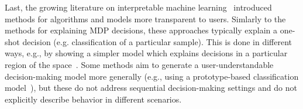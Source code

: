 
Last, the growing literature on interpretable machine learning~\cite{doshi2017towards,vellido2012making} introduced methods for algorithms and models more transparent to users. Simlarly to the methods for explaining MDP decisions, these approaches typically explain a one-shot decision (e.g. classification of a particular sample). This is done in different ways, e.g., by showing a simpler model which explains decisions in a particular region of the space~\cite{ribeiro2016model}. Some methods aim to generate a user-understandable decision-making model more generally (e.g., using a prototype-based classification model~\cite{kim2014bayesian}), but these do not address sequential decision-making settings and do not explicitly describe behavior in different scenarios.

